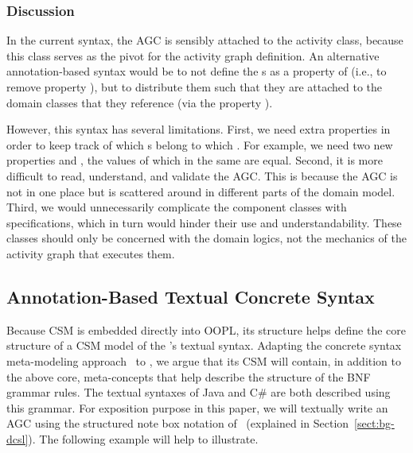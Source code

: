 \subsubsection*{Discussion} \label{sect:agl-discussion} %
In the current syntax, the AGC is sensibly attached to the activity class, because this class serves as the pivot for the activity graph definition.
%
An alternative annotation-based syntax would be to not define the s as a property of  (i.e., to remove property ), but to distribute them such that they are attached to the domain classes that they reference (via the property ). 

However, this syntax has several limitations. First, we need extra properties in order to keep track of which s belong to which . For example, we need two new properties  and , the values of which in the same  are equal. 
Second, it is more difficult to read, understand, and validate the AGC. This is because the AGC is not in one place but is scattered around in different parts of the domain model.
Third, we would unnecessarily complicate the component classes with  specifications, which in turn would hinder their use and understandability. These classes should only be concerned with the domain logics, not the mechanics of the activity graph that executes them.

\subsection{Annotation-Based Textual Concrete Syntax} 
\label{sect:agl-csSyntax}

Because CSM is embedded directly into OOPL, its structure helps define the core structure of a CSM model of the \agl's textual syntax. Adapting the concrete syntax meta-modeling approach~\cite{kleppe_software_2008} to \agl, we argue that its CSM will contain, in addition to the above core, meta-concepts that help describe the structure of the BNF grammar rules. The textual syntaxes of Java and C\# are both described using this grammar.
%
For exposition purpose in this paper, we will textually write an AGC using the structured note box notation of \dcsl~(explained in Section~\ref{sect:bg-dcsl}). The following example will help to illustrate.

